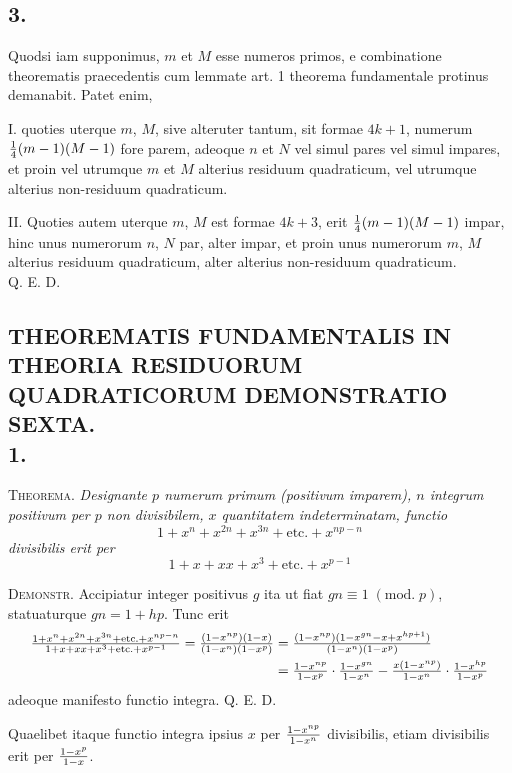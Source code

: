\documentclass[twoside,12pt]{memoir}
\renewcommand{\pmod}[1]{\;(\textrm{mod.}\;#1)}
\let\oldfrac\frac
\def\frac#1#2{\mathchoice{\tfrac{#1}{#2}}{\oldfrac{#1}{#2}}{\genfrac{}{}{}{2}{#1}{#2\mathstrut}}{\genfrac{}{}{}{3}{#1}{#2\mathstrut}}}
\begin{document}
\subsection*{3.}
 
Quodsi iam supponimus, \(m\) et \(M\) esse numeros primos, e combinatione theorematis praecedentis cum lemmate art. 1 theorema fundamentale protinus demanabit. Patet enim,
 
I. quoties uterque \(m\), \(M\), sive alteruter tantum, sit formae \(4 k+1\), numerum \(\frac{1}{4}(m-1)(M-1)\) fore parem, adeoque \(n\) et \(N\) vel simul pares vel simul impares, et proin vel utrumque \(m\) et \(M\) alterius residuum quadraticum, vel utrumque alterius non-residuum quadraticum.
 
II. Quoties autem uterque \(m\), \(M\) est formae \(4 k+3\), erit \(\frac{1}{4}(m-1)(M-1)\) impar, hinc unus numerorum \(n\), \(N\) par, alter impar, et proin unus numerorum \(m\), \(M\) alterius residuum quadraticum, alter alterius non-residuum quadraticum.\\ 
Q{.} E{.} D{.} \pagebreak%

\subsection*{{\scriptsize THEOREMATIS FUNDAMENTALIS IN THEORIA RESIDUORUM QUADRATICORUM DEMONSTRATIO SEXTA.}\\
1.}
 
\textsc{Theorema.} \textit{Designante \(p\) numerum primum (positivum imparem), \(n\) integrum positivum per \(p\) non divisibilem, \(x\) quantitatem indeterminatam, functio}
\[1+x^{n}+x^{2 n}+x^{3 n}+\text{etc.}+x^{n p-n}\]
\textit{divisibilis erit per}
\[1+x+x x+x^{3}+\text{etc.}+x^{p-1}\]
 
\textsc{Demonstr.} Accipiatur integer positivus \(g\) ita ut fiat \(g n \equiv 1\pmod{p}\), statuaturque \(g n=1+h p\). Tunc erit
\[\begin{aligned}
\frac{1+x^{n}+x^{2 n}+x^{3 n}+\text{etc.}+x^{n p-n}}{1+x+x x+x^{3}+\text{etc.}+x^{p-1}}=\frac{(1-x^{n p})(1-x)}{(1-x^{n})(1-x^{p})} & =\frac{(1-x^{n p})(1-x^{g n}-x+x^{h p+1})}{(1-x^{n})(1-x^{p})} \\
& =\frac{1-x^{n p}}{1-x^{p}} \cdot \frac{1-x^{g n}}{1-x^{n}}-\frac{x(1-x^{n p})}{1-x^{n}} \cdot \frac{1-x^{h p}}{1-x^{p}}
\end{aligned}\]
adeoque manifesto functio integra. Q. E. D.
 
Quaelibet itaque functio integra ipsius \(x\) per \(\frac{1-x^{n p}}{1-x^{n}}\) divisibilis, etiam divisibilis erit per \(\frac{1-x^{p}}{1-x}\).
\end{document}

